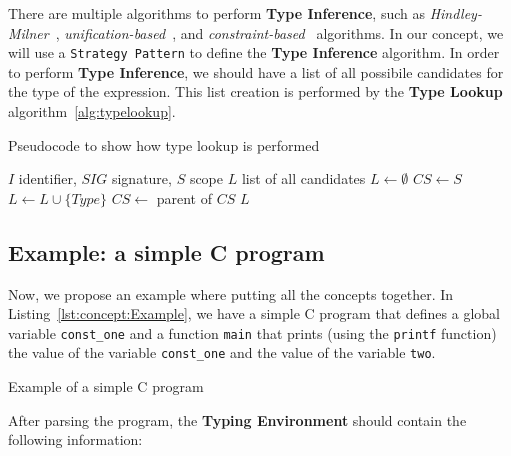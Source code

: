 There are multiple algorithms to perform \textbf{Type Inference}, such as \textit{Hindley-Milner}~\cite{Hindley69, Milner78}, \textit{unification-based}~\cite{Robinson65}, and \textit{constraint-based}~\cite{Pierce02} algorithms. In our concept, we will use a \texttt{Strategy Pattern} to define the \textbf{Type Inference} algorithm.
In order to perform \textbf{Type Inference}, we should have a list of all possibile candidates for the type of the expression. This list creation is performed by the \textbf{Type Lookup} algorithm~\ref{alg:typelookup}.

\begin{algorithm}[h]
\caption{Pseudocode to show how type lookup is performed\label{alg:typelookup}}
\begin{algorithmic}
\Require $I$ identifier, $SIG$ signature, $S$ scope
\Ensure$L$ list of all candidates
\State $L\gets\emptyset$ 
\State $CS \gets S$
\State $L \gets L\cup\{Type\}$
\EndIf
\EndFor
\State $CS \gets$ parent of $CS$ 
\EndWhile
\State\Return $L$
\end{algorithmic}
\end{algorithm}

\subsection{Example: a simple C program}\label{subsec:concept:ExampleASimpleCProgram}

Now, we propose an example where putting all the concepts together. In Listing~\ref{lst:concept:Example}, we have a simple C program that defines a global variable \texttt{const\_one} and a function \texttt{main} that prints (using the \texttt{printf} function) the value of the variable \texttt{const\_one} and the value of the variable \texttt{two}.

\begin{Listing}[tbh]
    \centering
    \caption{Example of a simple C program}
    \label{lst:concept:Example}
\end{Listing}

After parsing the program, the \textbf{Typing Environment} should contain the following information:

